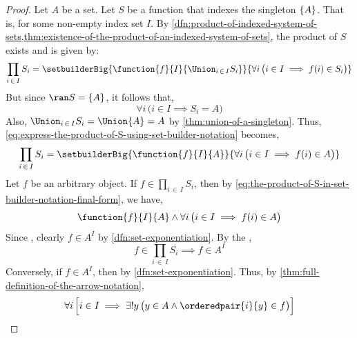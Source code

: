 \begin{proof}
    Let \( A \) be a set. Let \( S \) be a function that indexes the singleton \( \mleft\{ A \mright\} \). That is,
     for some non-empty index set \( I \).
    By \cref{dfn:product-of-indexed-system-of-sets,thm:existence-of-the-product-of-an-indexed-system-of-sets},
    the product of \( S \) exists and is given by:
    \begin{equation}
        \label{eq:express-the-product-of-S-using-set-builder-notation}
        \prod_{i \,\in\, I} S_{i} = \setbuilderBig{\function{f}{I}{\Union_{i \,\in\, I} S_{i} }}{\forall i \, \big( i \in I \implies f(i) \in S_{i} \big)}
    \end{equation}
    But since \( \ran S = \mleft\{ A \mright\} \), it follows that,
    \begin{equation*}
        \forall i \, \big( i \in I \implies S_{i} = A \big)
    \end{equation*}
    Also, \( \Union_{i \,\in\, I} S_{i} = \Union \mleft\{ A \mright\} = A \) by \cref{thm:union-of-a-singleton}.
    Thus, \eqref{eq:express-the-product-of-S-using-set-builder-notation} becomes,
    \begin{equation}
        \label{eq:the-product-of-S-in-set-builder-notation-final-form}
        \prod_{i \,\in\, I} S_{i} = \setbuilderBig{\function{f}{I}{A}}{\forall i \, \big( i \in I \implies f(i) \in A \big)}
    \end{equation}
    Let \( f \) be an arbitrary object. If \( f \in \prod_{i \,\in\, I} S_{i} \), then by \eqref{eq:the-product-of-S-in-set-builder-notation-final-form},
    we have,
    \begin{equation*}
        \function{f}{I}{A} \land \forall i \, \big( i \in I \implies f(i) \in A \big)
    \end{equation*}
    Since , clearly \( f \in A^{I} \) by \cref{dfn:set-exponentiation}.
    By the ,
    \begin{equation}
        \label{eq:f-in-product-implies-f-in-AI}
        f \in \prod_{i \,\in\, I} S_{i} \implies f \in A^{I}
    \end{equation}
    Conversely, if \( f \in A^{I} \), then  by \cref{dfn:set-exponentiation}.
    Thus, by \cref{thm:full-definition-of-the-arrow-notation},
    \begin{equation}
        \label{eq:every-i-in-I-has-a-unique-value}
        \forall i \, \Big[ i \in I \implies \exists! y \, \big( y \in A \land \orderedpair{i}{y} \in f \big) \Big]

\end{equation}
\end{proof}
